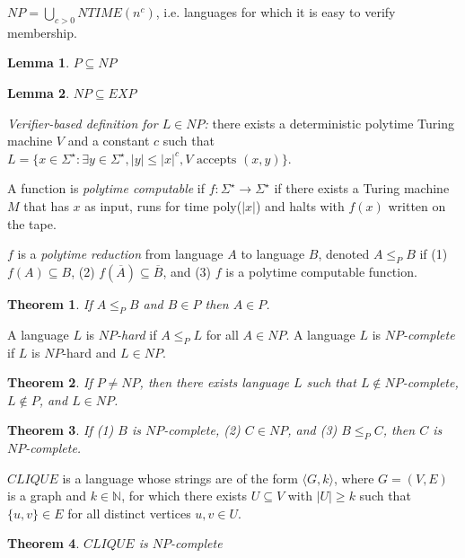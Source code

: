 \documentclass[letterpaper,landscape,11pt]{article}
\newtheorem{theorem}{Theorem}
\newtheorem{lemma}{Lemma}
\begin{document}
$NP = \bigcup_{c > 0} NTIME(n^c)$, i.e. languages for which it is easy to verify membership.

\begin{lemma}
	$P \subseteq NP$
\end{lemma}

\begin{lemma}
	$NP \subseteq EXP$
\end{lemma}

\emph{Verifier-based definition for $L \in NP$:} there exists a deterministic polytime Turing machine $V$ and a constant $c$ such that $L = \{x \in \Sigma^\star : \exists y \in \Sigma^\star, |y| \leq |x|^c, V \text{ accepts } (x, y)\}$.

A function is \emph{polytime computable} if $f : \Sigma^\star \rightarrow \Sigma^\star$ if there exists a Turing machine $M$ that has $x$ as input, runs for time poly($|x|$) and halts with $f(x)$ written on the tape.

$f$ is a \emph{polytime reduction} from language $A$ to language $B$, denoted $A \leq_P B$ if (1) $f(A) \subseteq B$, (2) $f(\overline{A}) \subseteq \overline{B}$, and (3) $f$ is a polytime computable function.

\begin{theorem}
	If $A \leq_P B$ and $B \in P$ then $A \in P$.
\end{theorem}

A language $L$ is \emph{$NP$-hard} if $A \leq_P L$ for all $A \in NP$. A language $L$ is \emph{$NP$-complete} if $L$ is $NP$-hard and $L \in NP$.

\begin{theorem}
	If $P \neq NP$, then there exists language $L$ such that $L \notin NP$-complete, $L \notin P$, and $L \in NP$.
\end{theorem}

\begin{theorem}
	If (1) $B$ is $NP$-complete, (2) $C \in NP$, and (3) $B \leq_P C$, then $C$ is $NP$-complete.
\end{theorem}

$CLIQUE$ is a language whose strings are of the form $\langle G, k \rangle$, where $G = (V, E)$ is a graph and $k \in \mathbb{N}$, for which there exists $U \subseteq V$ with $|U| \geq k$ such that $\{u, v\} \in E$ for all distinct vertices $u, v \in U$.

\begin{theorem}
	$CLIQUE$ is $NP$-complete
\end{theorem}
\end{document}
